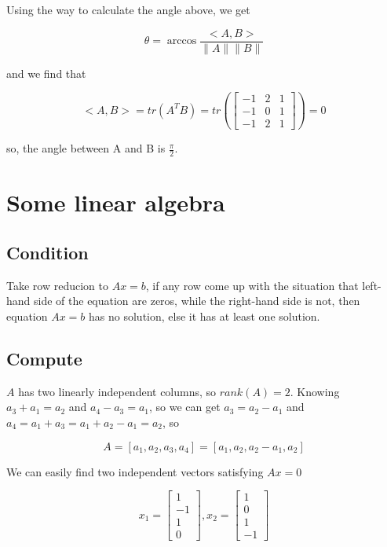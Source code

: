 \documentclass[titlepage]{article}
\begin{document}
Using the way to calculate the angle above, we get 

\begin{equation}
    \theta = \arccos{\frac{<A,B>}{\|A\|\|B\|}}
\end{equation}

and we find that

\begin{equation}
    <A,B>=tr(A^TB)=tr(
    \begin{bmatrix}
        -1 & 2 & 1 \\
        -1 & 0 & 1 \\
        -1 & 2 & 1
    \end{bmatrix})
    =0
\end{equation}

so, the angle between A and B is $\frac{\pi}{2}$.

\section{Some linear algebra}

\subsection{Condition}

Take row reducion to $Ax=b$, if any row come up with the situation 
that left-hand side of the equation are zeros, while the right-hand side is not, 
then equation $Ax=b$ has no solution, else it has at least one solution.

\subsection{Compute}

$A$ has two linearly independent columns, so $rank(A)=2$. Knowing $a_3+a_1=a_2$ and $a_4-a_3=a_1$, so we can get $a_3=a_2-a_1$ 
and $a_4=a_1+a_3=a_1+a_2-a_1=a_2$, so

\begin{equation}
    A=[a_1,a_2,a_3,a_4]=[a_1,a_2,a_2-a_1,a_2]
\end{equation}

We can easily find two independent vectors satisfying $Ax=0$

\begin{equation}
    x_1=
    \begin{bmatrix}
        1\\-1\\1\\0
    \end{bmatrix},
    x_2=
    \begin{bmatrix}
        1\\0\\1\\-1
    \end{bmatrix}
\end{equation}
\end{document}
